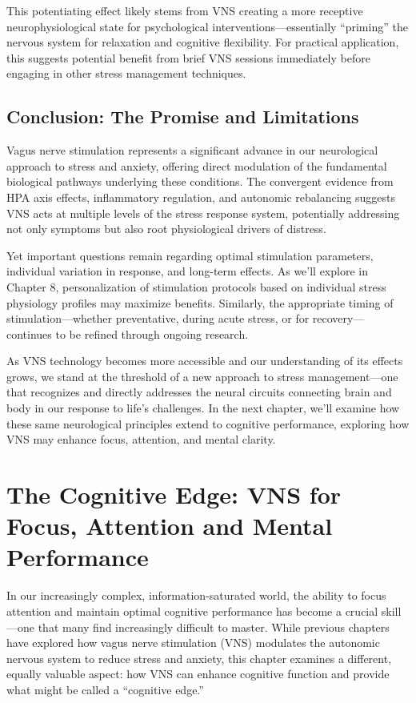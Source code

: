 \documentclass[
  Letterpaper,
]{scrbook}
\begin{document}
This potentiating effect likely stems from VNS creating a more receptive
neurophysiological state for psychological interventions---essentially
``priming'' the nervous system for relaxation and cognitive flexibility.
For practical application, this suggests potential benefit from brief
VNS sessions immediately before engaging in other stress management
techniques.

\section{Conclusion: The Promise and
Limitations}\label{conclusion-the-promise-and-limitations}

Vagus nerve stimulation represents a significant advance in our
neurological approach to stress and anxiety, offering direct modulation
of the fundamental biological pathways underlying these conditions. The
convergent evidence from HPA axis effects, inflammatory regulation, and
autonomic rebalancing suggests VNS acts at multiple levels of the stress
response system, potentially addressing not only symptoms but also root
physiological drivers of distress.

Yet important questions remain regarding optimal stimulation parameters,
individual variation in response, and long-term effects. As we'll
explore in Chapter 8, personalization of stimulation protocols based on
individual stress physiology profiles may maximize benefits. Similarly,
the appropriate timing of stimulation---whether preventative, during
acute stress, or for recovery---continues to be refined through ongoing
research.

As VNS technology becomes more accessible and our understanding of its
effects grows, we stand at the threshold of a new approach to stress
management---one that recognizes and directly addresses the neural
circuits connecting brain and body in our response to life's challenges.
In the next chapter, we'll examine how these same neurological
principles extend to cognitive performance, exploring how VNS may
enhance focus, attention, and mental clarity.


\chapter{The Cognitive Edge: VNS for Focus, Attention and Mental
Performance}\label{the-cognitive-edge-vns-for-focus-attention-and-mental-performance}

In our increasingly complex, information-saturated world, the ability to
focus attention and maintain optimal cognitive performance has become a
crucial skill---one that many find increasingly difficult to master.
While previous chapters have explored how vagus nerve stimulation (VNS)
modulates the autonomic nervous system to reduce stress and anxiety,
this chapter examines a different, equally valuable aspect: how VNS can
enhance cognitive function and provide what might be called a
``cognitive edge.''
\end{document}
